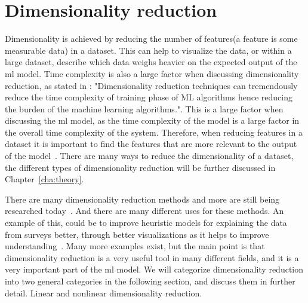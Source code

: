 

\section{Dimensionality reduction}\label{sec:dimensionality-reduction-problem}
Dimensionality is achieved by reducing the number of features(a feature is some measurable data) in a dataset. This can help to visualize the data, or within a large dataset, describe which data weighs heavier on the expected output of the \gls{ml} model. Time complexity is also a large factor when discussing dimensionality reduction, as stated in \cite{Analysis-of-Dimensionality-Reduction-Techniques-on-Big-Data}: "Dimensionality reduction techniques can tremendously reduce the time complexity of training phase of ML algorithms hence reducing the burden of the machine learning algorithms.". This is a large factor when discussing the \gls{ml} model, as the time complexity of the model is a large factor in the overall time complexity of the system. Therefore, when reducing features in a dataset it is important to find the features that are more relevant to the output of the model~\cite{Feature-engineering-zheng}. There are many ways to reduce the dimensionality of a dataset, the different types of dimensionality reduction will be further discussed in Chapter~\ref{cha:theory}.

There are many dimensionality reduction methods and more are still being researched today~\cite{dimensionality-reduction-cheng}. And there are many different uses for these methods. An example of this, could be to improve heuristic models for explaining the data from surveys better, through better visualizations as it helps to improve understanding~\cite{dimensionality-reduction-cheng}. Many more examples exist, but the main point is that dimensionality reduction is a very useful tool in many different fields, and it is a very important part of the \gls{ml} model. We will categorize dimensionality reduction into two general categories in the following section, and discuss them in further detail. Linear and nonlinear dimensionality reduction.





